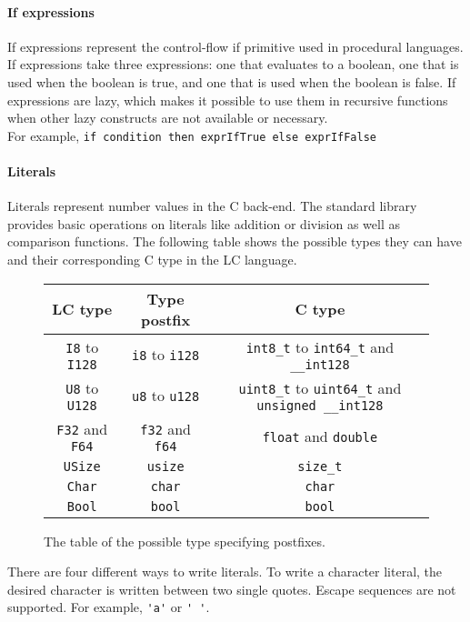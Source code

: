 \documentclass[12pt]{article}
\begin{document}
\paragraph{If expressions} If expressions represent the control-flow if
primitive used in procedural languages. If expressions take three expressions:
one that evaluates to a boolean, one that is used when the boolean is true, and
one that is used when the boolean is false. If expressions are lazy, which makes
it possible to use them in recursive functions when other lazy constructs are
not available or necessary. \\
For example, \verb$if condition then exprIfTrue else exprIfFalse$

\paragraph{Literals} Literals represent number values in the C back-end. The
standard library provides basic operations on literals like addition or division
as well as comparison functions. The following table shows the possible types
they can have and their corresponding C type in the LC language.
\begin{figure}[ht]
\begin{center}
\begin{tabular}{c c c}
    LC type & Type postfix & C type \\
    \hline
    \verb$I8$ to \verb$I128$ & \verb$i8$ to \verb$i128$ & \verb$int8_t$ to
    \verb$int64_t$ and \verb$__int128$ \\
    \verb$U8$ to \verb$U128$ & \verb$u8$ to \verb$u128$ & \verb$uint8_t$ to
    \verb$uint64_t$ and \verb$unsigned __int128$ \\
    \verb$F32$ and \verb$F64$ & \verb$f32$ and \verb$f64$ & \verb$float$ and
    \verb$double$ \\
    \verb$USize$ & \verb$usize$ & \verb$size_t$ \\
    \verb$Char$ & \verb$char$ & \verb$char$ \\
    \verb$Bool$ & \verb$bool$ & \verb$bool$
\end{tabular}
\end{center}
\caption{The table of the possible type specifying postfixes.}
\label{fig:type-specifying-postfix-table}
\end{figure}
There are four different ways to write literals. To write a character literal,
the desired character is written between two single quotes. Escape sequences are
not supported. For example, \verb$'a'$ or \verb$' '$.
\end{document}
